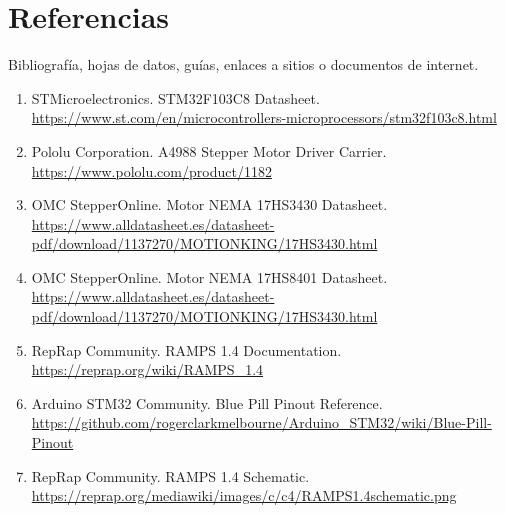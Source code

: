 \documentclass[12pt]{article}
\begin{document}
\section{Referencias}
Bibliografía, hojas de datos, guías, enlaces a sitios o documentos de internet.

\begin{enumerate}
  \item \label{ref1} STMicroelectronics. STM32F103C8 Datasheet. \\
  \url{https://www.st.com/en/microcontrollers-microprocessors/stm32f103c8.html}
  
  \item \label{ref2} Pololu Corporation. A4988 Stepper Motor Driver Carrier. \\
  \url{https://www.pololu.com/product/1182}
  
  \item \label{ref3} OMC StepperOnline. Motor NEMA 17HS3430 Datasheet. \\
  \url{https://www.alldatasheet.es/datasheet-pdf/download/1137270/MOTIONKING/17HS3430.html}
  
  \item \label{ref4} OMC StepperOnline. Motor NEMA 17HS8401 Datasheet. \\
  \url{https://www.alldatasheet.es/datasheet-pdf/download/1137270/MOTIONKING/17HS3430.html}
  
  \item \label{ref5} RepRap Community. RAMPS 1.4 Documentation. \\
  \url{https://reprap.org/wiki/RAMPS_1.4}
  
  \item \label{ref6} Arduino STM32 Community. Blue Pill Pinout Reference. \\
  \url{https://github.com/rogerclarkmelbourne/Arduino_STM32/wiki/Blue-Pill-Pinout}
  
  \item \label{ref7} RepRap Community. RAMPS 1.4 Schematic. \\
  \url{https://reprap.org/mediawiki/images/c/c4/RAMPS1.4schematic.png}
\end{enumerate}
\end{document}
